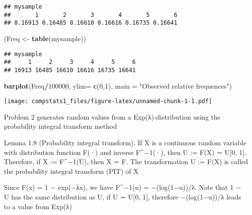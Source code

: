 \documentclass[
]{article}
\newenvironment{Shaded}{\begin{snugshade}}{\end{snugshade}}
\newcommand{\DataTypeTok}[1]{\textcolor[rgb]{0.13,0.29,0.53}{#1}}
\newcommand{\DecValTok}[1]{\textcolor[rgb]{0.00,0.00,0.81}{#1}}
\newcommand{\KeywordTok}[1]{\textcolor[rgb]{0.13,0.29,0.53}{\textbf{#1}}}
\newcommand{\NormalTok}[1]{#1}
\newcommand{\OperatorTok}[1]{\textcolor[rgb]{0.81,0.36,0.00}{\textbf{#1}}}
\newcommand{\StringTok}[1]{\textcolor[rgb]{0.31,0.60,0.02}{#1}}
\begin{document}
\begin{verbatim}
## mysample
##       1       2       3       4       5       6 
## 0.16913 0.16485 0.16610 0.16616 0.16735 0.16641
\end{verbatim}

\begin{Shaded}
\begin{Highlighting}[]
\NormalTok{(Freq <-}\StringTok{ }\KeywordTok{table}\NormalTok{(mysample))}
\end{Highlighting}
\end{Shaded}

\begin{verbatim}
## mysample
##     1     2     3     4     5     6 
## 16913 16485 16610 16616 16735 16641
\end{verbatim}

\begin{Shaded}
\begin{Highlighting}[]
\KeywordTok{barplot}\NormalTok{(Freq}\OperatorTok{/}\DecValTok{100000}\NormalTok{, }\DataTypeTok{ylim=} \KeywordTok{c}\NormalTok{(}\DecValTok{0}\NormalTok{,}\DecValTok{1}\NormalTok{),   }
\DataTypeTok{main =} \StringTok{"Observed relative frequences"}\NormalTok{)}
\end{Highlighting}
\end{Shaded}

\texttt{[image: compstats1\_files/figure-latex/unnamed-chunk-1-1.pdf]}

Problem 2 generates random values from a Exp(λ)-distribution using the
probability integral transform method

Lemma 1.8 (Probability integral transform). If X is a continuous random
variable with distribution function F(·) and inverse F\^{}−1(·), then U
:= F(X) ∼ U{[}0, 1{]}. Therefore, if X := F\^{}−1(U), then X ∼ F. The
transformation U := F(X) is called the probability integral transform
(PIT) of X

Since F(x) = 1 − exp(−λx), we have F\^{}−1(u) = −(log(1−u))/λ. Note that
1 − U has the same distribution as U, if U ∼ U{[}0, 1{]}, therefore
−(log(1−u))/λ leads to a value from Exp(λ)
\end{document}
